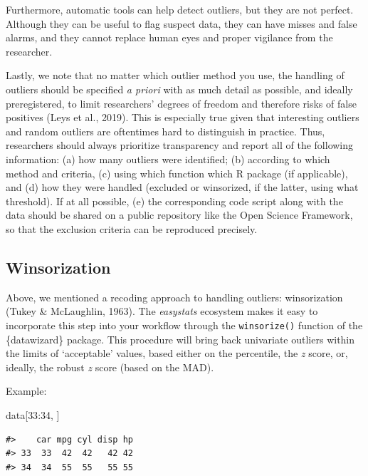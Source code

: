 \documentclass[
]{article}
\newenvironment{Shaded}{\begin{snugshade}}{\end{snugshade}}
\newcommand{\DecValTok}[1]{\textcolor[rgb]{0.00,0.00,0.81}{#1}}
\newcommand{\NormalTok}[1]{#1}
\newcommand{\SpecialCharTok}[1]{\textcolor[rgb]{0.00,0.00,0.00}{#1}}
\begin{document}
Furthermore, automatic tools can help detect outliers, but they are not perfect. Although they can be useful to flag suspect data, they can have misses and false alarms, and they cannot replace human eyes and proper vigilance from the researcher.

Lastly, we note that no matter which outlier method you use, the handling of outliers should be specified \emph{a priori} with as much detail as possible, and ideally preregistered, to limit researchers' degrees of freedom and therefore risks of false positives (Leys et al., 2019). This is especially true given that interesting outliers and random outliers are oftentimes hard to distinguish in practice. Thus, researchers should always prioritize transparency and report all of the following information: (a) how many outliers were identified; (b) according to which method and criteria, (c) using which function which R package (if applicable), and (d) how they were handled (excluded or winsorized, if the latter, using what threshold). If at all possible, (e) the corresponding code script along with the data should be shared on a public repository like the Open Science Framework, so that the exclusion criteria can be reproduced precisely.

\hypertarget{winsorization}{%
\subsection{Winsorization}\label{winsorization}}

Above, we mentioned a recoding approach to handling outliers: winsorization (Tukey \& McLaughlin, 1963). The \emph{easystats} ecosystem makes it easy to incorporate this step into your workflow through the \texttt{winsorize()} function of the \{datawizard\} package. This procedure will bring back univariate outliers within the limits of `acceptable' values, based either on the percentile, the \emph{z} score, or, ideally, the robust \emph{z} score (based on the MAD).

Example:

\begin{Shaded}
\begin{Highlighting}[]
\NormalTok{data[}\DecValTok{33}\SpecialCharTok{:}\DecValTok{34}\NormalTok{, ]}
\end{Highlighting}
\end{Shaded}

\begin{verbatim}
#>    car mpg cyl disp hp
#> 33  33  42  42   42 42
#> 34  34  55  55   55 55
\end{verbatim}
\end{document}
